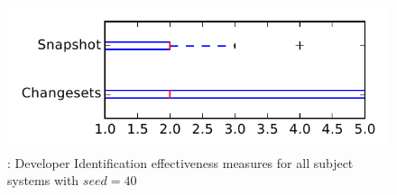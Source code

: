 
\begin{figure}
\centering
\includegraphics[height=0.4\textheight]{figures/dit_seed/rq1_tiny_40}
\caption{\rtwo: Developer Identification effectiveness measures for all subject systems with $seed=40$}
\label{fig:dit_seed:rq1:tiny}
\end{figure}
